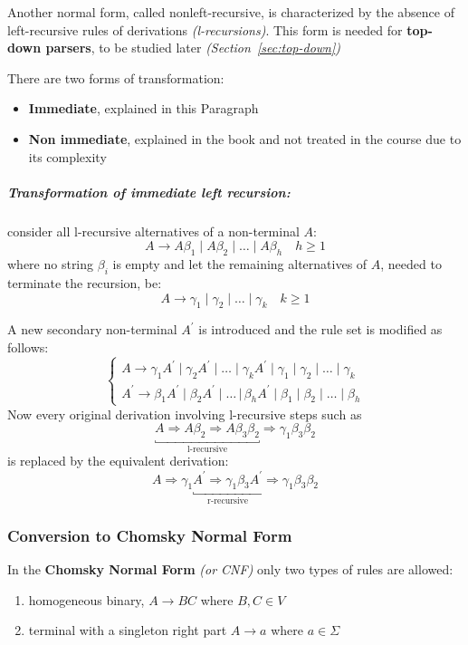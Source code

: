 \documentclass[english]{article}
\begin{document}
Another normal form, called nonleft-recursive, is characterized by the absence of left-recursive rules of derivations \textit{(l-recursions)}.
This form is needed for \textbf{top-down parsers}, to be studied later \textit{(Section~\ref{sec:top-down})}

There are two forms of transformation:
\begin{itemize}
  \item \textbf{Immediate}, explained in this Paragraph
  \item \textbf{Non immediate}, explained in the book and not treated in the course due to its complexity
\end{itemize}

\bigskip
\subparagraph*{Transformation of immediate left recursion:}
consider all l-recursive alternatives of a non-terminal \(A\):
\[ A \rightarrow A \beta_1 \mid A \beta_2 \mid \ldots \mid A \beta_h \quad h \geq 1 \]
where no string \(\beta_i\) is empty and let the remaining alternatives of \(A\), needed to terminate the recursion, be:
\[ A \rightarrow \gamma_1 \mid \gamma_2 \mid \ldots \mid \gamma_k \quad k \geq 1 \]

A new secondary non-terminal \(A^\prime\) is introduced and the rule set is modified as follows:
\[\begin{cases}
    A \rightarrow \gamma_1 A^\prime \mid \gamma_2 A^\prime \mid \ldots \mid \gamma_k A^\prime \mid \gamma_1 \mid \gamma_2 \mid \ldots \mid \gamma_k \\
    A^\prime \rightarrow \beta_1 A^\prime \mid \beta_2 A^\prime \mid \ldots \, |\, \beta_h A^\prime \mid \beta_1 \mid \beta_2 \mid \ldots \mid \beta_h
  \end{cases}\]
Now every original derivation involving l-recursive steps such as
\[\underbracket{A \Rightarrow A \beta_2 \Rightarrow A \beta_3 \beta_2}_{\text{l-recursive}} \Rightarrow \gamma_1 \beta_3 \beta_2 \]
is replaced by the equivalent derivation:
\[A \Rightarrow \gamma_1 \underbracket{A^\prime \Rightarrow \gamma_1 \beta_3 A^\prime}_{\text{r-recursive}} \Rightarrow \gamma_1 \beta_3 \beta_2 \]

\subsubsection{Conversion to Chomsky Normal Form}
\label{sec:conversion-to-chomsky-normal-form}

In the \textbf{Chomsky Normal Form} \textit{(or CNF)} only two types of rules are allowed:

\begin{enumerate}
  \item homogeneous binary, \(A \rightarrow BC\) where \(B, C \in V\)
  \item terminal with a singleton right part \(A \rightarrow a\) where \(a \in \Sigma\)
\end{enumerate}
\end{document}
